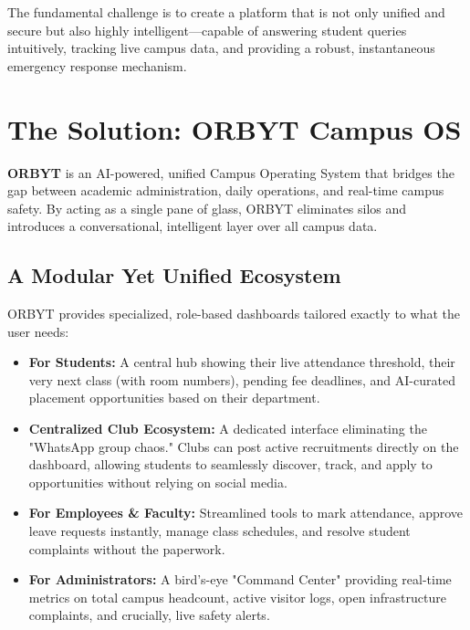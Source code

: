 \documentclass[11pt,a4paper]{article}
\begin{document}
The fundamental challenge is to create a platform that is not only unified and secure but also highly intelligent—capable of answering student queries intuitively, tracking live campus data, and providing a robust, instantaneous emergency response mechanism.

\section{The Solution: ORBYT Campus OS}

\textbf{ORBYT} is an AI-powered, unified Campus Operating System that bridges the gap between academic administration, daily operations, and real-time campus safety. By acting as a single pane of glass, ORBYT eliminates silos and introduces a conversational, intelligent layer over all campus data.

\subsection{A Modular Yet Unified Ecosystem}
ORBYT provides specialized, role-based dashboards tailored exactly to what the user needs:
\begin{itemize}
    \item \textbf{For Students:} A central hub showing their live attendance threshold, their very next class (with room numbers), pending fee deadlines, and AI-curated placement opportunities based on their department.
    \item \textbf{Centralized Club Ecosystem:} A dedicated interface eliminating the "WhatsApp group chaos." Clubs can post active recruitments directly on the dashboard, allowing students to seamlessly discover, track, and apply to opportunities without relying on social media.
    \item \textbf{For Employees \& Faculty:} Streamlined tools to mark attendance, approve leave requests instantly, manage class schedules, and resolve student complaints without the paperwork.
    \item \textbf{For Administrators:} A bird's-eye "Command Center" providing real-time metrics on total campus headcount, active visitor logs, open infrastructure complaints, and crucially, live safety alerts.
\end{itemize}
\end{document}
